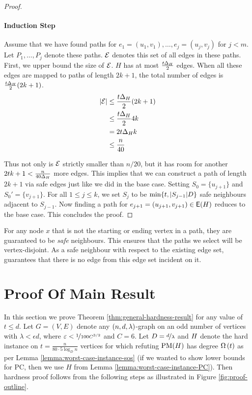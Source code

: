 \documentclass[11pt]{article}
\begin{document}
\begin{proof}
\paragraph{Induction Step}

Assume that we have found paths for $e_1 = (u_1, v_1), \dots, e_j=(u_j, v_j)$ for $j < m$.
Let $P_1, \dots, P_j$ denote these paths.
$\GlobalEdgeSet$ denotes this set of all edges in these paths.
First, we upper bound the size of $\GlobalEdgeSet$.
$H$ has at most $\frac{t\MaxDegree{H}}{2}$ edges.
When all these edges are mapped to paths of length $2k+1$, the total number of edges is $\frac{t\MaxDegree{H}}{2}(2k+1)$.
\begin{align*}
  \Size{\GlobalEdgeSet}  &\leq \frac{t\MaxDegree{H}}{2}(2k+1) \\
                         &\le \frac{t\MaxDegree{H}}{2}4k \\
                         &= 2t\MaxDegree{H}k \\
                         &\leq \frac{n}{40}
\end{align*}

Thus not only is $\GlobalEdgeSet$ strictly smaller than $n/20$, but it has room for another $2tk+1 < \frac{n}{40\MaxDegree{H}}$ more edges.
This implies that we can construct a path of length $2k+1$ via safe edges just like we did in the base case.
Setting $S_0 = \{ u_{j+1}\}$ and $S_0' = \{v_{j+1} \}$.
For all $1 \le j \le k$, we set $S_{j}$ to be $\min\{t, \Size{S_{j-1}}D \}$ safe neighbours adjacent to $S_{j-1}$.
Now finding a path for $e_{j+1} = (u_{j+1},v_{j+1}) \in \Edges{H}$ reduces to the base case.
This concludes the proof.

\end{proof}

\begin{remark}For any node $x$ that is not the starting or ending vertex in a path, they are guaranteed to be \emph{safe} neighbours.
  This ensures that the paths we select will be vertex-disjoint.
  As a safe neighbour with respect to the existing edge set, guarantees that there is no edge from this edge set incident on it.
\end{remark}


\section{Proof Of Main Result}
\label{sec:main-proof}

In this section we prove Theorem \ref{thm:general-hardness-result} for any value of $t \leq d$.
Let $G=(V,E)$ denote any $\EnDeeLambda$-graph on an odd number of vertices with $\lambda < \epsilon d$, where $\epsilon < \nicefrac{1}{100C^{3/2}}$ and $C=6$. Let $D=\nicefrac{d}{\lambda}$ and $\HardInstance$ denote the hard instance on $t=\frac{n}{80\cdot 5\log_D n}$ vertices for which refuting $\PM{H}$ has degree $\BigOmega{t}$ as per Lemma \ref{lemma:worst-case-instance-sos} (if we wanted to show lower bounds for PC, then we use $H$ from Lemma \ref{lemma:worst-case-instance-PC}).
Then hardness proof follows from the following steps as illustrated in Figure \ref{fig:proof-outline}.
\end{document}
